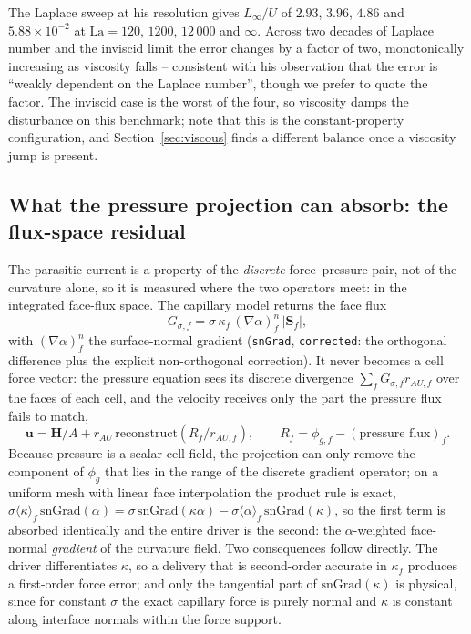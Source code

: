 \documentclass[preprint,3p,11pt]{elsarticle}
\begin{document}
The Laplace sweep at his resolution gives $L_\infty/U$ of $2.93$, $3.96$, $4.86$ and
$5.88\times10^{-2}$ at $\mathrm{La}=120$, $1200$, $12\,000$ and $\infty$. Across two decades
of Laplace number and the inviscid limit the error changes by a factor of two, monotonically
increasing as viscosity falls -- consistent with his observation that the error is ``weakly
dependent on the Laplace number'', though we prefer to quote the factor. The inviscid case
is the worst of the four, so viscosity damps the disturbance on this benchmark; note that
this is the constant-property configuration, and Section~\ref{sec:viscous} finds a different
balance once a viscosity jump is present.

\subsection{What the pressure projection can absorb: the flux-space residual}
\label{sec:fluxresidual}
The parasitic current is a property of the \emph{discrete} force--pressure pair, not of the
curvature alone, so it is measured where the two operators meet: in the integrated face-flux
space. The capillary model returns the face flux
\begin{equation}
  G_{\sigma,f} = \sigma\,\kappa_f\,(\nabla\alpha)^n_f\,\lvert\mathbf{S}_f\rvert ,
  \label{eq:gsigmaface}
\end{equation}
with $(\nabla\alpha)^n_f$ the surface-normal gradient (\texttt{snGrad}, \texttt{corrected}: the
orthogonal difference plus the explicit non-orthogonal correction). It never becomes a cell force
vector: the pressure equation sees its discrete divergence $\sum_f G_{\sigma,f} r_{AU,f}$ over the
faces of each cell, and the velocity receives only the part the pressure flux fails to match,
\begin{equation}
  \mathbf{u} = \mathbf{H}/A + r_{AU}\,\mathrm{reconstruct}\!\left(R_f / r_{AU,f}\right),
  \qquad R_f = \phi_{g,f} - (\text{pressure flux})_f .
  \label{eq:fluxresidual}
\end{equation}
Because pressure is a scalar cell field, the projection can only remove the component of
$\phi_g$ that lies in the range of the discrete gradient operator; on a uniform mesh with linear
face interpolation the product rule is exact,
$\sigma\langle\kappa\rangle_f\,\mathrm{snGrad}(\alpha) =
 \sigma\,\mathrm{snGrad}(\kappa\alpha) - \sigma\langle\alpha\rangle_f\,\mathrm{snGrad}(\kappa)$,
so the first term is absorbed identically and the entire driver is the second: the
$\alpha$-weighted face-normal \emph{gradient} of the curvature field. Two consequences follow
directly. The driver differentiates $\kappa$, so a delivery that is second-order accurate in
$\kappa_f$ produces a first-order force error; and only the tangential part of
$\mathrm{snGrad}(\kappa)$ is physical, since for constant $\sigma$ the exact capillary force is
purely normal and $\kappa$ is constant along interface normals within the force support.
\end{document}
